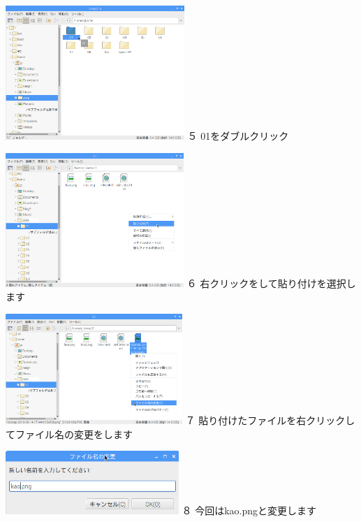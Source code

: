 \documentclass[a4paper,12pt]{jarticle}
\begin{document}
\centering
\begin{minipage}[b]{6.8cm}
  \includegraphics[width=6.77cm,height=5.092cm]{textbook-img167.png}
  \newline
  ５ 01をダブルクリック
\end{minipage}
\hspace{10mm}
\begin{minipage}[b]{7.559cm}
  \includegraphics[width=6.743cm,height=5.073cm]{textbook-img168.png}
  \newline
  ６
  右クリックをして貼り付けを選択します
\end{minipage}


\bigskip


\begin{minipage}[b]{6.878cm}
  \includegraphics[width=6.692cm,height=4.186cm]{textbook-img169.png}
  \newline
  ７
  貼り付けたファイルを右クリックしてファイル名の変更をします
\end{minipage}
\hspace{10mm}
\begin{minipage}[b]{6.846cm}
  \includegraphics[width=6.558cm,height=2.408cm]{textbook-img166.png}
  ８ 今回はkao.pngと変更します
  \newline
\end{minipage}
\end{document}
